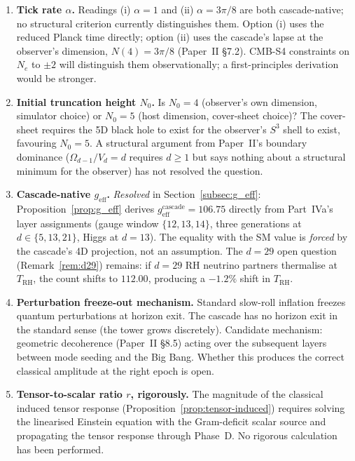 \documentclass[12pt,a4paper]{article}
\begin{document}
\begin{enumerate}[leftmargin=*,nosep]

\item \textbf{Tick rate $\alpha$.} Readings (i) $\alpha = 1$ and (ii) $\alpha
= 3\pi/8$ are both cascade-native; no structural criterion currently
distinguishes them. Option (i) uses the reduced Planck time directly; option
(ii) uses the cascade's lapse at the observer's dimension, $N(4) = 3\pi/8$
(Paper~II \S7.2). CMB-S4 constraints on $N_e$ to $\pm 2$ will distinguish
them observationally; a first-principles derivation would be stronger.

\item \textbf{Initial truncation height $N_0$.} Is $N_0 = 4$ (observer's own
dimension, simulator choice) or $N_0 = 5$ (host dimension, cover-sheet
choice)? The cover-sheet requires the 5D black hole to exist for the
observer's $S^3$ shell to exist, favouring $N_0 = 5$. A structural argument
from Paper~II's boundary dominance ($\Omega_{d-1}/V_d = d$ requires $d \geq 1$
but says nothing about a structural minimum for the observer) has not
resolved the question.

\item \textbf{Cascade-native $g_{\mathrm{eff}}$.}
\emph{Resolved} in Section~\ref{subsec:g_eff}:
Proposition~\ref{prop:g_eff} derives $g_{\mathrm{eff}}^{\mathrm{cascade}} =
106.75$ directly from Part~IVa's layer assignments (gauge window
$\{12, 13, 14\}$, three generations at $d \in \{5, 13, 21\}$, Higgs at
$d = 13$). The equality with the SM value is \emph{forced} by the
cascade's 4D projection, not an assumption. The $d = 29$ open question
(Remark~\ref{rem:d29}) remains: if $d = 29$ RH neutrino partners
thermalise at $T_{\mathrm{RH}}$, the count shifts to $112.00$,
producing a $-1.2\%$ shift in $T_{\mathrm{RH}}$.

\item \textbf{Perturbation freeze-out mechanism.} Standard slow-roll inflation
freezes quantum perturbations at horizon exit. The cascade has no horizon
exit in the standard sense (the tower grows discretely). Candidate mechanism:
geometric decoherence (Paper~II \S8.5) acting over the subsequent layers
between mode seeding and the Big Bang. Whether this produces the correct
classical amplitude at the right epoch is open.

\item \textbf{Tensor-to-scalar ratio $r$, rigorously.} The magnitude of the
classical induced tensor response (Proposition~\ref{prop:tensor-induced})
requires solving the linearised Einstein equation with the Gram-deficit
scalar source and propagating the tensor response through Phase~D. No
rigorous calculation has been performed.


\end{enumerate}
\end{document}
